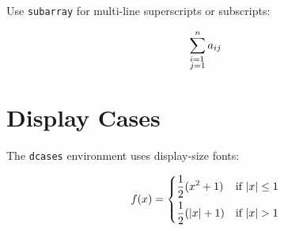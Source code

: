 \documentclass{article}
\begin{document}
Use \texttt{subarray} for multi-line superscripts or subscripts:

\begin{equation}
\sum_{\begin{subarray}{l}
  i=1 \\
  j=1
\end{subarray}}^{n} a_{ij}
\end{equation}

\section{Display Cases}

The \texttt{dcases} environment uses display-size fonts:

\begin{equation}
f(x) = \begin{dcases}
  \frac{1}{2}(x^2 + 1) & \text{if } |x| \leq 1 \\
  \frac{1}{2}(|x| + 1) & \text{if } |x| > 1
\end{dcases}
\end{equation}
\end{document}
